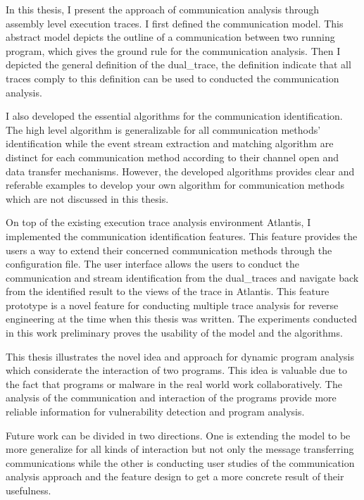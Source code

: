 \label{concl}
In this thesis, I present the approach of communication analysis through assembly level execution traces. I first defined the communication model. This abstract model depicts the outline of a communication between two running program, which gives the ground rule for the communication analysis. Then I depicted the general definition of the dual\_trace, the definition indicate that all traces comply to this definition can be used to conducted the communication analysis.

I also developed the essential algorithms for the communication identification. The high level algorithm is generalizable for all communication methods' identification while  the event stream extraction and matching algorithm are distinct for each communication method according to their channel open and data transfer mechanisms. However, the developed algorithms provides clear and referable examples to develop your own algorithm for communication methods which are not discussed in this thesis.

On top of the existing execution trace analysis environment Atlantis, I implemented the communication identification features. This feature provides the users a way to extend their concerned communication methods through the configuration file. The user interface allows the users to conduct the communication and stream identification from the dual\_traces and navigate back from the identified result to the views of the trace in Atlantis. This feature prototype is a novel feature for conducting multiple trace analysis for reverse engineering at the time when this thesis was written. The experiments conducted in this work preliminary proves the usability of the model and the algorithms. 

This thesis illustrates the novel idea and approach for dynamic program analysis which considerate the interaction of two programs. This idea is valuable due to the fact that programs or malware in the real world work collaboratively. The analysis of the communication and interaction of the programs provide more reliable information for vulnerability detection and program analysis.

Future work can be divided in two directions. One is extending the model to be more generalize for all kinds of interaction but not only the message transferring communications while the other is conducting user studies of the communication analysis approach and the feature design to get a more concrete result of their usefulness.

